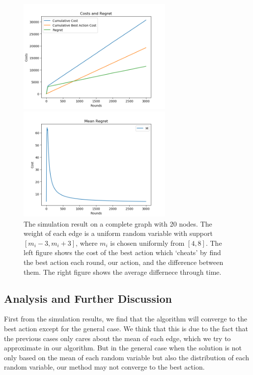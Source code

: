 \documentclass{article}
\theoremstyle{plain}
\theoremstyle{definition}
\theoremstyle{remark}
\begin{document}
    \begin{figure}[htbp!]
        \begin{minipage}[h]{0.5\linewidth}
            \centering
            \includegraphics[width=3in]{general-cost-regret-uni.png}
        \end{minipage}
        \begin{minipage}[h]{0.5\linewidth}
            \centering
            \includegraphics[width=3in]{general-mean-regret-uni.png}
        \end{minipage}
        \caption{The simulation result on a complete graph with 20 nodes. The weight of each edge is a uniform random variable with support $[m_i-3,m_i+3]$, where $m_i$ is chosen uniformly from $[4,8]$. The left figure shows the cost of the best action which `cheats' by find the best action each round, our action, and the difference between them. The right figure shows the average differnece through time.}
        \label{general-uni}
    \end{figure}

    \subsection{Analysis and Further Discussion}
    First from the simulation results, we find that the algorithm will converge to the best action except for the general case. We think that this is due to the fact that the previous cases only cares about the mean of each edge, which we try to approximate in our algorithm. But in the general case when the solution is not only based on the mean of each random variable but also the distribution of each random variable, our method may not converge to the best action.\\
    
\end{document}
